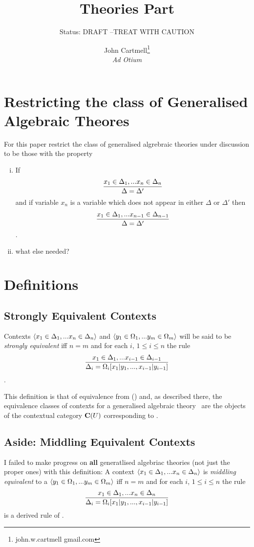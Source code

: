 \documentclass[10pt,a4paper]{scrartcl}
\title{ Theories Part}
\author{John Cartmell\footnote{john.w.cartmell gmail.com}\\ \normalsize{\textit{Ad Otium}}}
\subtitle{Status: \normalsize{DRAFT --TREAT WITH CAUTION}}
\begin{document}
\maketitle

\section{Restricting the class of Generalised Algebraic Theores}
For this paper restrict the class of generalised algrebraic theories under 
discussion to be those with the property 
\begin{enumerate}[(i)]
\item 
If
$$
\frac{x_1 \in \Delta_1,... x_{n} \in \Delta_{n}}{\Delta=\Delta'}
$$
\intheory and if variable $x_n$ is a variable which does not appear in either
$\Delta$ or $\Delta'$ then
$$
\frac{x_1 \in \Delta_1,... x_{n-1} \in \Delta_{n-1}}{\Delta=\Delta'}
$$
\intheory.
\item
what else needed? 
\end{enumerate}
\section{Definitions}
\subsection{Strongly Equivalent Contexts}
\begin{definition}
Contexts $\langle x_1 \in \Delta_1,... x_{n} \in \Delta_{n}\rangle$ 
and $\langle y_1 \in \Omega_1,... y_{m} \in \Omega_{m}\rangle$ will be said to be \textit{strongly equivalent} iff $n=m$ and for each $i$, $1 \leq i \leq n$ the rule 
$$
\frac{x_1 \in \Delta_1,... x_{i-1} \in \Delta_{i-1}}{\Delta_i=\Omega_i[x_1|y_1,...,x_{i-1}|y_{i-1}]}
$$
\intheory.
\end{definition}

This definition is that of equivalence from (\cite{Cartmell78})  and, as described there, the  equivalence classes of contexts for a generalised algebraic theory \gat\  are the objects of the contextual category $\mathbf{C}(U)$ corresponding to \gat.

\subsection{Aside: Middling Equivalent Contexts}
I failed to make progress on \textbf{all} generatlised algebriac theories
(not just the proper ones) with this definition:
A context $\langle x_1 \in \Delta_1,... x_{n} \in \Delta_{n}\rangle$ 
is  \textit{middling equivalent}  to a $\langle y_1 \in \Omega_1,... y_{m} \in \Omega_{m}\rangle$ iff $n=m$ and for each $i$, $1 \leq i \leq n$ the rule 
$$
\frac{x_1 \in \Delta_1,... x_{n} \in \Delta_{n}}{\Delta_i=\Omega_i[x_1|y_1,...,x_{i-1}|y_{i-1}]}
$$
is a derived rule of \gat. \\
\end{document}
